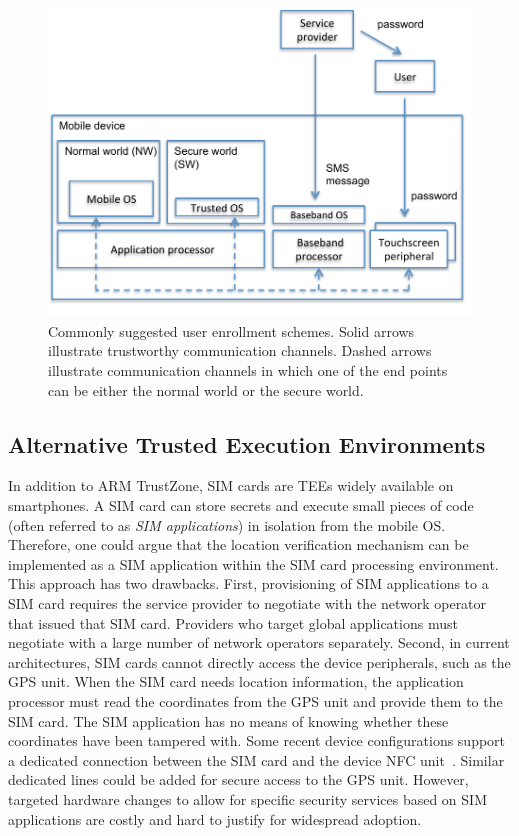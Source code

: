 \begin{figure}[!t]
    \centering
    \includegraphics[width=.8\linewidth]{figures/phonesecures/tee_channels2}
    \caption[Commonly suggested user enrollment schemes]{Commonly suggested
    user enrollment schemes. Solid arrows illustrate trustworthy communication
    channels. Dashed arrows illustrate communication channels in which one of
    the end points can be either the normal world or the secure world.}
    \label{fig:ps_tee_channels}
\end{figure}

\subsection{Alternative Trusted Execution Environments}

In addition to ARM TrustZone, SIM cards are TEEs widely available on
smartphones. A SIM card can store secrets and execute small pieces of code
(often referred to as \emph{SIM applications}) in isolation from the mobile OS.
Therefore, one could argue that the location verification mechanism can be
implemented as a SIM application within the SIM card processing environment.
This approach has two drawbacks. First, provisioning of SIM applications to a
SIM card requires the service provider to negotiate with the network operator
that issued that SIM card. Providers who target global applications must
negotiate with a large number of network operators separately. Second, in
current architectures, SIM cards cannot directly access the device peripherals,
such as the GPS unit. When the SIM card needs location information, the
application processor must read the coordinates from the GPS unit and provide
them to the SIM card. The SIM application has no means of knowing whether these
coordinates have been tampered with. Some recent device configurations support
a dedicated connection between the SIM card and the device NFC
unit~\cite{gsma2011}. Similar dedicated lines could be added for secure access
to the GPS unit. However, targeted hardware changes to allow for specific
security services based on SIM applications are costly and hard to justify for
widespread adoption.

